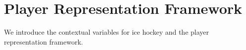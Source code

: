 \documentclass[letterpaper]{article} %
\newcommand{\latentvariables}{\mathbf{z}}
\newcommand{\hiddenstate}{\mathbf{h}}
\newcommand{\state}{\mathbf{s}}
\newcommand{\action}{\mathbf{a}}
\newcommand{\player}{pl}
\begin{document}


\section{Player Representation Framework}
We introduce the contextual variables for ice hockey and the player representation framework.
\end{document}
